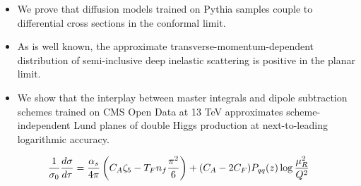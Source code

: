 \begin{itemize}
  \item We prove that diffusion models trained on Pythia samples couple to differential cross sections in the conformal limit.
  \item As is well known, the approximate transverse-momentum-dependent distribution of semi-inclusive deep inelastic scattering is positive in the planar limit.
  \item We show that the interplay between master integrals and dipole subtraction schemes trained on CMS Open Data at 13 TeV approximates scheme-independent Lund planes of double Higgs production at next-to-leading logarithmic accuracy.
\end{itemize}

\begin{equation}
  \frac{1}{\sigma_0} \frac{d\sigma}{d\tau} = \frac{\alpha_s}{4\pi} \left( C_A \zeta_{5} - T_F n_f \frac{\pi^2}{6} \right) + (C_A - 2C_F) P_{qq}(z) \log\frac{\mu_R^2}{Q^2}
  \label{eq:7}
\end{equation}

